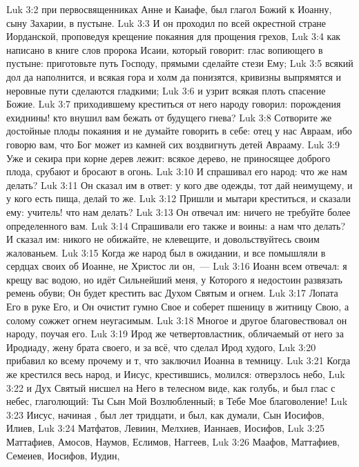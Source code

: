 \vs Luk 3:2 при первосвященниках Анне и Каиафе, был глагол Божий к Иоанну, сыну Захарии, в пустыне.
\vs Luk 3:3 И он проходил по всей окрестной стране Иорданской, проповедуя крещение покаяния для прощения грехов,
\vs Luk 3:4 как написано в книге слов пророка Исаии, который говорит: глас вопиющего в пустыне: приготовьте путь Господу, прямыми сделайте стези Ему;
\vs Luk 3:5 всякий дол да наполнится, и всякая гора и холм да понизятся, кривизны выпрямятся и неровные пути сделаются гладкими;
\vs Luk 3:6 и узрит всякая плоть спасение Божие.
\vs Luk 3:7  приходившему креститься от него народу говорил: порождения ехиднины! кто внушил вам бежать от будущего гнева?
\vs Luk 3:8 Сотворите же достойные плоды покаяния и не думайте говорить в себе: отец у нас Авраам, ибо говорю вам, что Бог может из камней сих воздвигнуть детей Аврааму.
\vs Luk 3:9 Уже и секира при корне дерев лежит: всякое дерево, не приносящее доброго плода, срубают и бросают в огонь.
\vs Luk 3:10 И спрашивал его народ: что же нам делать?
\vs Luk 3:11 Он сказал им в ответ: у кого две одежды, тот дай неимущему, и у кого есть пища, делай то же.
\vs Luk 3:12 Пришли и мытари креститься, и сказали ему: учитель! что нам делать?
\vs Luk 3:13 Он отвечал им: ничего не требуйте более определенного вам.
\vs Luk 3:14 Спрашивали его также и воины: а нам что делать? И сказал им: никого не обижайте, не клевещите, и довольствуйтесь своим жалованьем.
\vs Luk 3:15 Когда же народ был в ожидании, и все помышляли в сердцах своих об Иоанне, не Христос ли он,~---
\vs Luk 3:16 Иоанн всем отвечал: я крещу вас водою, но идёт Сильнейший меня, у Которого я недостоин развязать ремень обуви; Он будет крестить вас Духом Святым и огнем.
\vs Luk 3:17 Лопата Его в руке Его, и Он очистит гумно Свое и соберет пшеницу в житницу Свою, а солому сожжет огнем неугасимым.
\vs Luk 3:18 Многое и другое благовествовал он народу, поучая его.
\rsbpar\vs Luk 3:19 Ирод же четвертовластник, обличаемый от него за Иродиаду, жену брата своего, и за всё, что сделал Ирод худого,
\vs Luk 3:20 прибавил ко всему прочему и т, что заключил Иоанна в темницу.
\rsbpar\vs Luk 3:21 Когда же крестился весь народ, и Иисус, крестившись, молился: отверзлось небо,
\vs Luk 3:22 и Дух Святый нисшел на Него в телесном виде, как голубь, и был глас с небес, глаголющий: Ты Сын Мой Возлюбленный; в Тебе Мое благоволение!
\rsbpar\vs Luk 3:23 Иисус, начиная , был лет тридцати, и был, как думали, Сын Иосифов, Илиев,
\vs Luk 3:24 Матфатов, Левиин, Мелхиев, Ианнаев, Иосифов,
\vs Luk 3:25 Маттафиев, Амосов, Наумов, Еслимов, Наггеев,
\vs Luk 3:26 Маафов, Маттафиев, Семеиев, Иосифов, Иудин,
